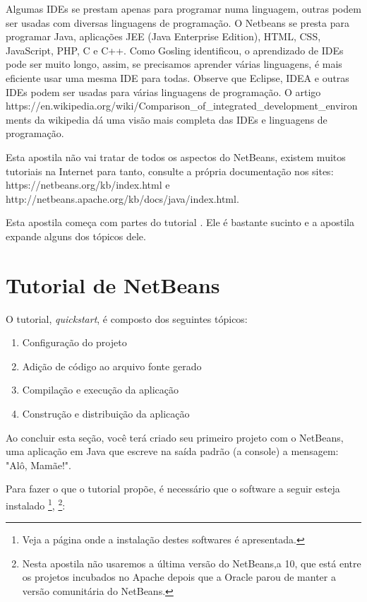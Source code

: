 \documentclass[
	12pt,				%
	twoside,			%
	a4paper,			%
	english,			%
	french,				%
	spanish,			%
	brazil				%
	]{abntex2}
\begin{document}
Algumas IDEs se prestam apenas para programar numa linguagem, outras podem ser usadas com diversas linguagens de programação. O Netbeans se presta para programar Java, aplicações JEE (Java Enterprise Edition), HTML, CSS, JavaScript, PHP, C e C++. Como Gosling identificou, o aprendizado de IDEs pode ser muito longo, assim, se precisamos aprender várias linguagens, é mais eficiente usar uma mesma IDE para todas. Observe que Eclipse, IDEA e outras IDEs podem ser usadas para várias linguagens de programação. O artigo https://en.wikipedia.org/wiki/Comparison\_of\_integrated\_development\_environments da wikipedia dá uma visão mais completa das IDEs e linguagens de programação.

Esta apostila não vai tratar de todos os aspectos do NetBeans, existem muitos tutoriais na Internet para tanto, consulte a própria documentação nos sites:\\
https://netbeans.org/kb/index.html e http://netbeans.apache.org/kb/docs/java/index.html. 

Esta apostila começa com partes do tutorial \cite{netbeans-quick}. Ele é bastante sucinto e a apostila expande alguns dos tópicos dele.

\section{Tutorial de NetBeans }
O tutorial, \textit{quickstart},  é composto dos seguintes tópicos:

\begin{enumerate}
\item Configuração do projeto
\item Adição de código ao arquivo fonte gerado
\item Compilação e execução da aplicação
\item Construção e distribuição da aplicação
\end{enumerate}

Ao concluir esta seção, você terá criado seu primeiro projeto com o NetBeans, uma aplicação em Java que escreve na saída padrão (a console) a mensagem: "Alô, Mamãe!".

Para fazer o que o tutorial propõe, é necessário que o software a seguir esteja instalado
\footnote{Veja a página \pageref{part:inst} onde a instalação destes softwares é apresentada.},
\footnote{Nesta apostila não usaremos a última versão do NetBeans,a 10, que está entre os projetos incubados no Apache depois que a Oracle parou de manter a versão comunitária do NetBeans.}:
\end{document}
